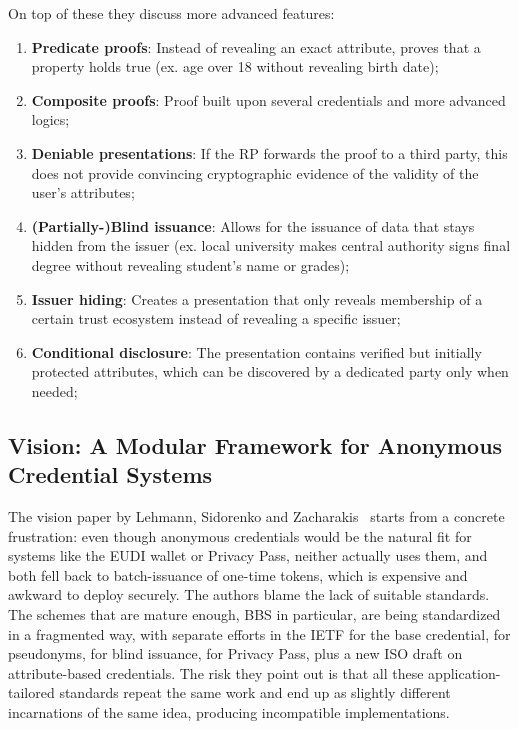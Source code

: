 \documentclass{article}
\begin{document}
On top of these they discuss more advanced features: 
\begin{enumerate}
      \item \textbf{Predicate proofs}:  Instead of revealing an exact attribute, proves that a property holds true (ex. age over 18 without revealing birth date);
      \item \textbf{Composite proofs}: Proof built upon several credentials and more advanced logics;
      \item \textbf{Deniable presentations}:  If the RP forwards the proof to a third party, this does not provide convincing cryptographic evidence of the validity of the user’s attributes;
      \item \textbf{(Partially-)Blind issuance}: Allows for the issuance of data that stays hidden from the issuer (ex. local university makes central authority signs final degree without revealing student's name or grades);
      \item \textbf{Issuer hiding}: Creates a presentation that only reveals membership of a certain trust ecosystem instead of revealing a specific issuer;
      \item \textbf{Conditional disclosure}: The presentation contains verified but initially protected attributes, which can be discovered by a dedicated party only when needed;
\end{enumerate}

\subsection{Vision: A Modular Framework for Anonymous Credential Systems}
\label{vision}
The vision paper by Lehmann, Sidorenko and Zacharakis~\cite{Lehmann2025Vision} starts from a concrete frustration: even
though anonymous credentials would be the natural fit for systems like the EUDI wallet or Privacy Pass, neither actually
uses them, and both fell back to batch-issuance of one-time tokens, which is expensive and awkward to deploy securely.
The authors blame the lack of suitable standards. The schemes that are mature enough, BBS in particular, are being
standardized in a fragmented way, with separate efforts in the IETF for the base credential, for pseudonyms, for blind
issuance, for Privacy Pass, plus a new ISO draft on attribute-based credentials. The risk they point out is that all
these application-tailored standards repeat the same work and end up as slightly different incarnations of the same idea,
producing incompatible implementations.
\end{document}
